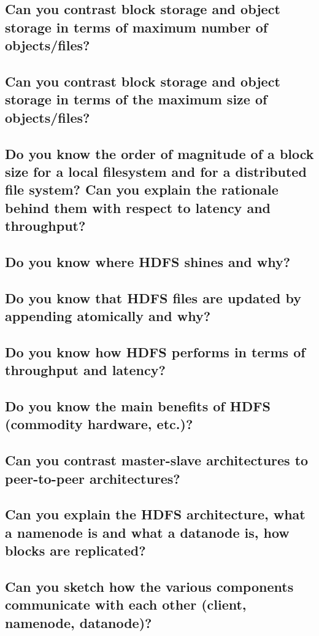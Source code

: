 \documentclass{article}
\begin{document}
\subsection{Can you contrast block storage and object storage in terms of maximum number of objects/files?}
\subsection{Can you contrast block storage and object storage in terms of the maximum size of objects/files?}
\subsection{Do you know the order of magnitude of a block size for a local filesystem and for a distributed file system? Can you explain the rationale behind them with respect to latency and throughput?}
\subsection{Do you know where HDFS shines and why?}
\subsection{Do you know that HDFS files are updated by appending atomically and why?}
\subsection{Do you know how HDFS performs in terms of throughput and latency?}
\subsection{Do you know the main benefits of HDFS (commodity hardware, etc.)?}
\subsection{Can you contrast master-slave architectures to peer-to-peer architectures?}
\subsection{Can you explain the HDFS architecture, what a namenode is and what a datanode is, how blocks are replicated?}
\subsection{Can you sketch how the various components communicate with each other (client, namenode, datanode)?}
\end{document}
